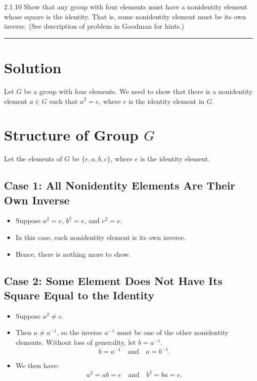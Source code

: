 \documentclass[12pt]{amsart}
\theoremstyle{definition}
\numberwithin{equation}{section}
\begin{document}
\begin{exercise}{2.1.10} 
Show that any group with four elements must have a nonidentity element whose square is the identity. That is, some nonidentity element must be its own inverse. (See description of problem in Goodman for hints.)

\noindent\rule{\linewidth}{1pt}

\section*{Solution}

Let \(G\) be a group with four elements. We need to show that there is a nonidentity element \(a \in G\) such that \(a^2 = e\), where \(e\) is the identity element in \(G\).

\section*{Structure of Group \(G\)}

Let the elements of \(G\) be \(\{e, a, b, c\}\), where \(e\) is the identity element.

\subsection*{Case 1: All Nonidentity Elements Are Their Own Inverse}

\begin{itemize}
    \item Suppose \(a^2 = e\), \(b^2 = e\), and \(c^2 = e\).
    \item In this case, each nonidentity element is its own inverse.
    \item Hence, there is nothing more to show.
\end{itemize}

\subsection*{Case 2: Some Element Does Not Have Its Square Equal to the Identity}

\begin{itemize}
    \item Suppose \(a^2 \neq e\).
    \item Then \(a \neq a^{-1}\), so the inverse \(a^{-1}\) must be one of the other nonidentity elements. Without loss of generality, let \(b = a^{-1}\).
    \[
    b = a^{-1} \quad \text{and} \quad a = b^{-1}.
    \]
    \item We then have:
    \[
    a^2 = ab = e \quad \text{and} \quad b^2 = ba = e.
    \]
\end{itemize}


\end{exercise}
\end{document}
